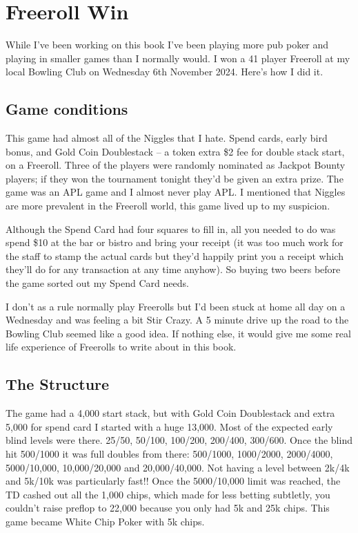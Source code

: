 \chapter{Freeroll Win}


While I've been working on this book I've been playing more
pub poker and playing in smaller games than I normally would. I won a
41 player Freeroll at my local Bowling Club on Wednesday 6th November
2024. Here's how I did it.

\section{Game conditions}

This game had almost all of the Niggles that I hate.
Spend cards, early bird bonus, and Gold Coin Doublestack -- a token
extra \$2 fee for double stack start, on a Freeroll. Three of the
players were randomly nominated as Jackpot Bounty players; if they won the
tournament tonight they'd be given an extra prize. The game was an APL
game and I almost never play APL. I mentioned that Niggles are more
prevalent in the Freeroll world, this game lived up to my suspicion.

Although the Spend Card had four squares to fill in, all you
needed to do was spend \$10 at the bar or bistro and bring your
receipt (it was too much work for the staff to stamp the actual
cards but they'd happily print you a receipt which they'll do
for any transaction at any time anyhow). So buying two beers
before the game sorted out my Spend Card needs.

I don't as a rule normally play Freerolls but I'd been stuck
at home all day on a Wednesday and was feeling a bit Stir Crazy.
A 5 minute drive up the road to the Bowling Club seemed like
a good idea. If nothing else, it would give me some real life
experience of Freerolls to write about in this book.

\section{The Structure}

The game had a 4,000 start stack, but with Gold Coin Doublestack
and extra 5,000 for spend card I started with a huge 13,000. Most of
the expected early blind levels were there. 25/50, 50/100, 100/200,
200/400, 300/600. Once the blind hit 500/1000 it was full
doubles from there: 500/1000, 1000/2000, 2000/4000, 5000/10,000,
10,000/20,000 and 20,000/40,000. Not having a level between 2k/4k and
5k/10k was particularly fast!! Once the 5000/10,000 limit was
reached, the TD cashed out all the 1,000 chips, which made for less
betting subtletly, you couldn't raise preflop to 22,000 because you
only had 5k and 25k chips. This game became White Chip
Poker with 5k chips.

